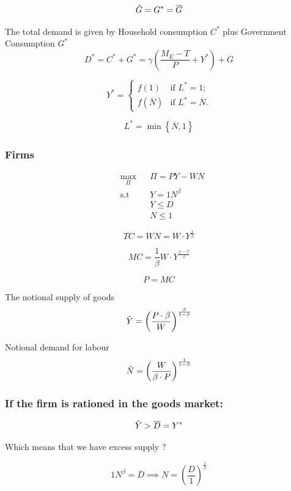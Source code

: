 $$
\Tilde{G} = G^* = \overline{G}
$$


The total demand is given by Household consumption $C^*$ plus Government Consumption $G^*$
$$
D^* = C^* + G^* = \gamma \left( \frac{M_E - T}{P} + Y^* \right) + \overline{G}
$$

\[ Y^* = \left\{ \begin{array}{ll}
         f(1) & \mbox{if $L^* = 1$};\\
        f(\overline{N}) & \mbox{if $L^* = \overline{N}$}.\end{array} \right. \] 
        
        
        
$$
L^* = \min \left\{ \overline{N}, 1 \right\}
$$

\subsubsection*{Firms}

\begin{equation*}
\begin{aligned}
& \underset{\Pi}{\max}
& & \Pi = PY - WN \\
& \text{s.t}
& & Y = 1N^\beta \\
& & &  Y \leq D \\
& &  & N \leq 1
\end{aligned}
\end{equation*}

$$
TC = WN = W \cdot Y^{\frac{1}{\beta}}
$$

$$
MC  = \frac{1}{\beta} W \cdot Y^{\frac{1 - \beta}{\beta}}
$$

$$
P = MC
$$

The notional supply of goods
$$
\Tilde{Y} = \left( \frac { P \cdot \beta} { W } \right) ^ { \frac { \beta } { 1 - \beta } }
$$

Notional demand for labour
$$
\Tilde{N} = \left( \frac { W } { \beta \cdot P } \right) ^ { \frac { 1 } { 1 - \beta } }
$$

\subsubsection*{If the firm is rationed in the goods market: }

$$
\Tilde{Y} > \overline{D} = Y^*
$$

Which means that we have excess supply ?


$$
1 N^{\beta} = \overline{D} \implies N = \left( \frac{D}{1} \right)^{\frac{1}{\beta}} 
$$


